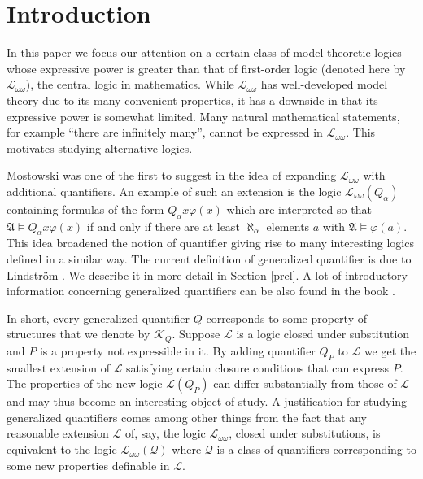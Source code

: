 \documentclass{ndjflart}
\theoremstyle{plain}
\theoremstyle{definition}
\numberwithin{equation}{section}
\begin{document}

\section{Introduction}

In this paper we focus our attention on a certain class of model-theoretic logics whose expressive power is greater than that of first-order logic (denoted here by $\mathcal{L}_{\omega\omega}$), the central logic in mathematics.
While $\mathcal{L}_{\omega\omega}$ has well-developed model theory due to its many convenient properties, it has a downside in that its expressive power is somewhat limited.
Many natural mathematical statements, for example ``there are infinitely many'', cannot be expressed in $\mathcal{L}_{\omega\omega}$.
This motivates studying alternative logics.

Mostowski was one of the first to suggest in \cite{Mostowski:1957}
the idea of expanding $\mathcal{L}_{\omega\omega}$ with additional quantifiers.
An example of such an extension is the logic $\mathcal{L}_{\omega\omega}(Q_{\alpha})$ containing formulas of the form $Q_{\alpha} x \varphi(x)$ which are interpreted so that $\mathfrak{A} \vDash  Q_{\alpha} x \varphi(x)$ if and only if there are at least $\aleph_{\alpha}$ elements $a$ with $\mathfrak{A} \vDash \varphi(a)$.
This idea broadened the notion of quantifier giving rise to many interesting logics defined in a similar way.
The current definition of generalized quantifier is due to Lindstr\"om \cite{Lindstrom:1966}. We describe it in more detail in Section \ref{prel}.
A lot of introductory information concerning generalized quantifiers can be also found in the book \cite{Ebbinghaus:1985}.

In short, every generalized quantifier $Q$ corresponds to some property of structures that we denote by $\mathcal{K}_Q$.
Suppose $\mathcal{L}$ is a logic closed under substitution and $P$ is a property not expressible in it. By adding quantifier $Q_P$ to $\mathcal{L}$ we get the smallest extension of $\mathcal{L}$ satisfying certain closure conditions that can express $P$.
The properties of the new logic $\mathcal{L}(Q_P)$ can differ substantially from those of $\mathcal{L}$ and may thus become an interesting object of study.
A justification for studying generalized quantifiers comes among other things from the fact that any reasonable extension $\mathcal{L}$ of, say, the logic $\mathcal{L}_{\omega\omega}$,
closed under substitutions, is equivalent to the logic $\mathcal{L}_{\omega\omega}(\mathcal{Q})$ where $\mathcal{Q}$ is a class of quantifiers corresponding to some new properties definable in $\mathcal{L}$.
\end{document}
